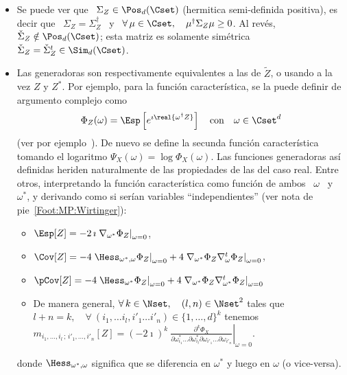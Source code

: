 \begin{itemize}
\begin{itemize}
\[      \Sigma_{X,Y} + \Sigma_{X,Y}^t \right)
    \]
    Entonces,  se  recupera  inmediatamente   $\Sigma_X,  \:  \Sigma_Y$  \  y  \
    $\Sigma_{X,Y}$  \  a  partir  de  \ $\Sigma_Z$  \  y  \  $\check{\Sigma}_Z$;
    Claramente,  los  momentos  centrales de  orden  2  son  dados por  ambas  \
    $\Sigma_Z$ \ y \ $\check{\Sigma}_Z$.
  \end{itemize}
  Los momentos  as\'i definidos heriden  naturalmente de las propiedades  de las
  del caso real.
%
\item  Se puede  ver que  \ $\Sigma_Z  \in \Pos_d(\Cset)$  (hermitica semi-definida
  positiva), es decir que \ $\Sigma_Z = \Sigma_Z^\dag$ \ y \ $\forall \, \mu \in
  \Cset,  \quad \mu^\dag  \Sigma_Z \mu  \ge 0$.   Al  rev\'es, $\check{\Sigma}_Z
  \notin \Pos_d(\Cset)$; esta matriz  es solamente sim\'etrica \ $\check{\Sigma}_Z
  = \check{\Sigma}_Z^t \in \Sim_d(\Cset)$.
%
\item Las generadoras son respectivamente equivalentes a las de $\widetilde{Z}$,
  o  usando   a  la  vez   $Z$  y  $Z^*$.    Por  ejemplo,  para   la  funci\'on
  caracter\'istica, se la puede definir de argumento complejo como
  \[
  \Phi_Z(\omega)  =  \Esp\left[ e^{\imath  \real{\omega^\dag  Z}} \right]  \quad
  \mbox{con} \quad \omega \in \Cset^d
  \]
  (ver  por  ejemplo~\cite[Cap.~17]{Lap17}).   De  nuevo se  define  la  secunda
  funci\'on  caracter\'istica  tomando   el  logaritmo  $\Psi_X(\omega)  =  \log
  \Phi_X(\omega)$.    Las   funciones   generadoras  as\'i   definidas   heriden
  naturalmente  de  las  propiedades  de   las  del  caso  real.   Entre  otros,
  interpretando la funci\'on caracter\'istica como funci\'on de ambos \ $\omega$
  \ y  \ $\omega^*$, y  derivando como si ser\'ian  variables ``independientes''
  (ver nota de pie~\ref{Foot:MP:Wirtinger}):
  \begin{itemize}
  \item $\Esp[Z]  = - 2 \, \imath  \left. \nabla_{\omega^*} \Phi_Z  \right|_{\omega =
      0}$,
  \item $\Cov[Z] = - 4 \left. \Hess_{\omega^*,\omega} \Phi_Z \right|_{\omega = 0} +
    4 \left. \nabla_{\omega^*}  \Phi_Z \nabla_{\omega}^t \Phi_Z  \right|_{\omega =
      0}$,
  \item  $\pCov[Z] =  - 4 \left.  \Hess_{\omega^*}  \Phi_Z \right|_{\omega  = 0}  +
    4 \left. \nabla_{\omega^*} \Phi_Z \nabla_{\omega^*}^t \Phi_Z \right|_{\omega =
      0}$
  \item De  manera general, $\forall  \, k \in  \Nset, \quad (l,n)  \in \Nset^2$
    tales que $ l+n = k, \quad \forall  \: (i_1 , \ldots i_l , i'_1 \ldots i'_n)
    \in \{ 1  , \ldots , d \}^k$ tenemos  $m_{i_1 , \ldots , i_l \,  ; \, i'_1 ,
      \ldots   ,  i'_n}[Z]  =   \left.  (-   2  \imath)^k   \:  \frac{\partial^k
        \Phi_X}{\partial \omega^*_{i_1}  \ldots \partial \omega^*_{i_l} \partial
        \omega_{i'_1} \ldots \partial \omega_{i'_n} } \right|_{\omega = 0}$.
  \end{itemize}
  donde $\Hess_{\omega^*,\omega}$  significa que  se diferencia en  $\omega^*$ y
  luego en $\omega$ (o vice-versa).
\end{itemize}

